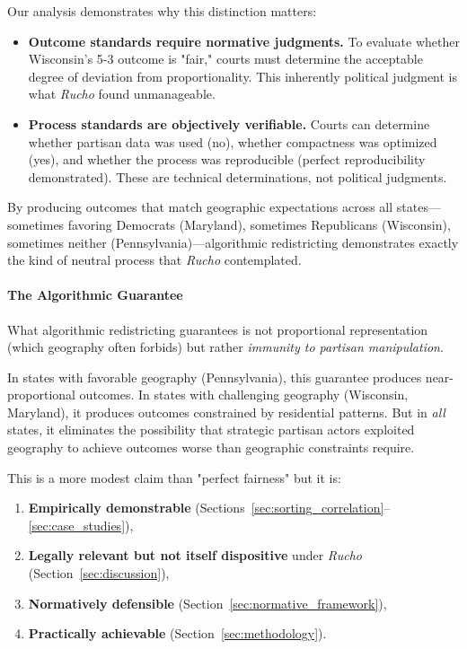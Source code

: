 Our analysis demonstrates why this distinction matters:
\begin{itemize}
\item \textbf{Outcome standards require normative judgments.} To evaluate whether Wisconsin's 5-3 outcome is "fair," courts must determine the acceptable degree of deviation from proportionality. This inherently political judgment is what \textit{Rucho} found unmanageable.

\item \textbf{Process standards are objectively verifiable.} Courts can determine whether partisan data was used (no), whether compactness was optimized (yes), and whether the process was reproducible (perfect reproducibility demonstrated). These are technical determinations, not political judgments.
\end{itemize}

By producing outcomes that match geographic expectations across all states---sometimes favoring Democrats (Maryland), sometimes Republicans (Wisconsin), sometimes neither (Pennsylvania)---algorithmic redistricting demonstrates exactly the kind of neutral process that \textit{Rucho} contemplated.

\paragraph{The Algorithmic Guarantee}

What algorithmic redistricting guarantees is not proportional representation (which geography often forbids) but rather \textit{immunity to partisan manipulation}.

In states with favorable geography (Pennsylvania), this guarantee produces near-proportional outcomes. In states with challenging geography (Wisconsin, Maryland), it produces outcomes constrained by residential patterns. But in \textit{all} states, it eliminates the possibility that strategic partisan actors exploited geography to achieve outcomes worse than geographic constraints require.

This is a more modest claim than "perfect fairness" but it is:
\begin{enumerate}
\item \textbf{Empirically demonstrable} (Sections~\ref{sec:sorting_correlation}--\ref{sec:case_studies}),
\item \textbf{Legally relevant but not itself dispositive} under \textit{Rucho} (Section~\ref{sec:discussion}),
\item \textbf{Normatively defensible} (Section~\ref{sec:normative_framework}),
\item \textbf{Practically achievable} (Section~\ref{sec:methodology}).
\end{enumerate}

